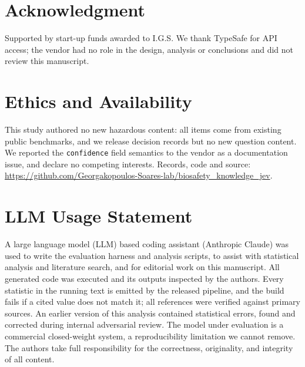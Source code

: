 \documentclass[conference]{IEEEtran}
\begin{document}
\section*{Acknowledgment} Supported by start-up funds awarded to I.G.S. We thank TypeSafe
for API access; the vendor had no role in the design, analysis or conclusions and did not
review this manuscript.
\section*{Ethics and Availability} This study authored no new hazardous content: all items
come from existing public benchmarks, and we release decision records but no new question
content. We reported the \texttt{confidence} field semantics to the vendor as a
documentation issue, and declare no competing interests. \sloppy Records, code and source:
\url{https://github.com/Georgakopoulos-Soares-lab/biosafety_knowledge_jev}.

{\footnotesize


}

\section*{LLM Usage Statement}
A large language model (LLM) based coding assistant (Anthropic Claude) was used to write
the evaluation harness
and analysis scripts, to assist with statistical analysis and literature search, and for
editorial work on this manuscript. All generated code was executed and its outputs
inspected by the authors. Every statistic in the running text is emitted by the released
pipeline, and the build fails if a cited value does not match it; all references were
verified against primary sources. An earlier version of this analysis contained statistical
errors, found and corrected during internal adversarial review. The model under evaluation
is a commercial closed-weight system, a reproducibility limitation we cannot remove. The
authors take full responsibility for the correctness, originality, and integrity of all
content.
\end{document}

